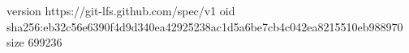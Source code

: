 version https://git-lfs.github.com/spec/v1
oid sha256:eb32c56e6390f4d9d340ea42925238ac1d5a6be7cb4c042ea8215510eb988970
size 699236

